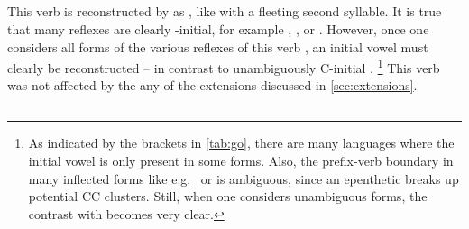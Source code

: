 \subsection{ }
\label{sec:go}
This verb is reconstructed by \textcite{gildea2007greenberg} as , like   with a fleeting second syllable.
It is true that many reflexes are clearly -initial, for example \hixka {}  \parencite[27]{hixkaryanaderby1985}, \trio {}  \parencite[246]{triomeira1999}, or \wayana {}  \parencite[195]{wayanatavares2005}.
However, once one considers all forms of the various reflexes of this verb , an initial vowel  must clearly be reconstructed -- in contrast to unambiguously C-initial  .%
\footnote{As indicated by the brackets in \cref{tab:go}, there are many languages where the initial vowel is only present in some forms.
Also, the prefix-verb boundary in many inflected forms like e.g.\ \trio {} or \arara {}  \parencites[43]{triomeira1999}[153]{alves2017arara} is ambiguous, since an epenthetic  breaks up potential CC clusters.
Still, when one considers unambiguous forms, the contrast with  becomes very clear.}
This verb was not affected by the any of the extensions discussed in \cref{sec:extensions}.


%

\subsection{ }
\label{sec:come}

